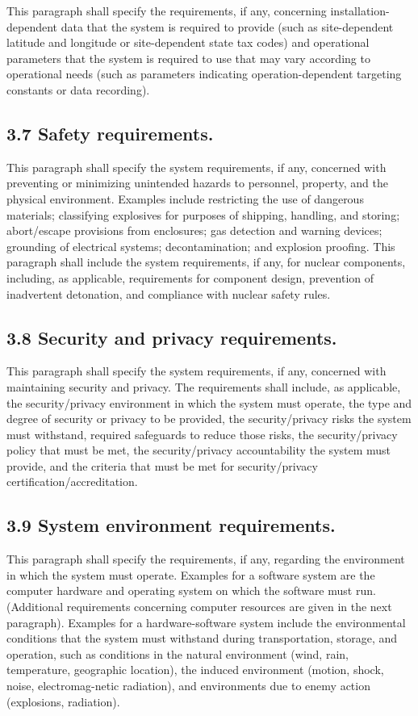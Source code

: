 This paragraph shall specify the requirements, if any, concerning
installation-dependent data that the system is required to provide (such
as site-dependent latitude and longitude or site-dependent state tax
codes) and operational parameters that the system is required to use
that may vary according to operational needs (such as parameters
indicating operation-dependent targeting constants or data recording).

\subsection{3.7 Safety requirements.}

This paragraph shall specify the system requirements, if any, concerned
with preventing or minimizing unintended hazards to personnel, property,
and the physical environment. Examples include restricting the use of
dangerous materials; classifying explosives for purposes of shipping,
handling, and storing; abort/escape provisions from enclosures; gas
detection and warning devices; grounding of electrical systems;
decontamination; and explosion proofing. This paragraph shall include
the system requirements, if any, for nuclear components, including, as
applicable, requirements for component design, prevention of inadvertent
detonation, and compliance with nuclear safety rules.

\subsection{3.8 Security and privacy requirements.}

This paragraph shall specify the system requirements, if any, concerned
with maintaining security and privacy. The requirements shall include,
as applicable, the security/privacy environment in which the system must
operate, the type and degree of security or privacy to be provided, the
security/privacy risks the system must withstand, required safeguards to
reduce those risks, the security/privacy policy that must be met, the
security/privacy accountability the system must provide, and the
criteria that must be met for security/privacy
certification/accreditation.

\subsection{3.9 System environment requirements.}

This paragraph shall specify the requirements, if any, regarding the
environment in which the system must operate. Examples for a software
system are the computer hardware and operating system on which the
software must run. (Additional requirements concerning computer
resources are given in the next paragraph). Examples for a
hardware-software system include the environmental conditions that the
system must withstand during transportation, storage, and operation,
such as conditions in the natural environment (wind, rain, temperature,
geographic location), the induced environment (motion, shock, noise,
electromag-netic radiation), and environments due to enemy action
(explosions, radiation).

